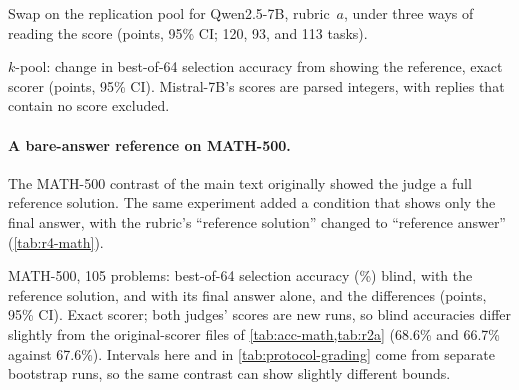 \begin{table}[htbp]
\centering
\caption{Swap on the replication pool for Qwen2.5-7B, rubric~$a$, under three ways of reading the score (points, 95\% CI; 120, 93, and 113 tasks).\pre}
\label{tab:r4-rotation}
\footnotesize
\setlength{\tabcolsep}{3pt}
\begin{adjustbox}{max width=\linewidth}\end{adjustbox}

\end{table}

\begin{table}[htbp]
\centering
\caption{$k$-pool: change in best-of-64 selection accuracy from showing the reference, exact scorer (points, 95\% CI). Mistral-7B's scores are parsed integers, with replies that contain no score excluded.\pre}
\label{tab:r4-kpool}
\footnotesize
\setlength{\tabcolsep}{3pt}
\begin{adjustbox}{max width=\linewidth}\end{adjustbox}

\end{table}

\paragraph{A bare-answer reference on MATH-500.}
The MATH-500 contrast of the main text originally showed the judge a full reference solution. The same experiment added a condition that shows only the final answer, with the rubric's ``reference solution'' changed to ``reference answer'' (\cref{tab:r4-math}).\pre

\begin{table}[htbp]
\centering
\caption{MATH-500, 105 problems: best-of-64 selection accuracy (\%) blind, with the reference solution, and with its final answer alone, and the differences (points, 95\% CI). Exact scorer; both judges' scores are new runs, so blind accuracies differ slightly from the original-scorer files of \cref{tab:acc-math,tab:r2a} (68.6\% and 66.7\% against 67.6\%). Intervals here and in \cref{tab:protocol-grading} come from separate bootstrap runs, so the same contrast can show slightly different bounds.\pre}
\label{tab:r4-math}
\footnotesize
\setlength{\tabcolsep}{3pt}
\begin{adjustbox}{max width=\linewidth}\end{adjustbox}

\end{table}

